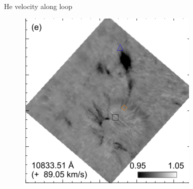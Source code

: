 \documentclass{beamer}
\begin{document}
\begin{frame}{He velocity along loop}
 
\begin{figure}[H]
 \centering
 \includegraphics[scale=0.6]{spe.png}
\end{figure}

\end{frame}
\end{document}
